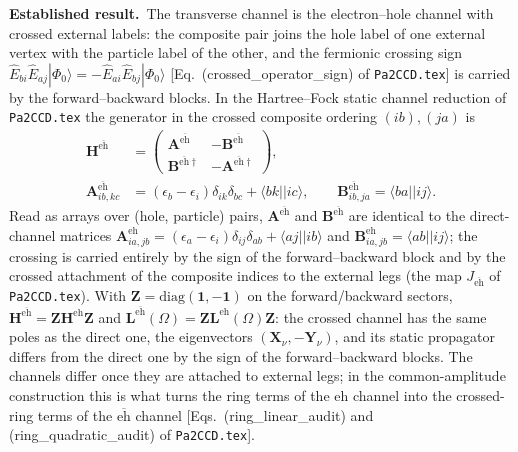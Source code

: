 \documentclass[aip,jcp,reprint,noshowkeys,superscriptaddress]{revtex4-1}
\newcommand{\bI}{\boldsymbol{1}}
\newcommand{\bH}{\boldsymbol{H}}
\newcommand{\bA}{\boldsymbol{A}}
\newcommand{\bB}{\boldsymbol{B}}
\newcommand{\bX}{\boldsymbol{X}}
\newcommand{\bY}{\boldsymbol{Y}}
\newcommand{\bZ}{\boldsymbol{Z}}
\newcommand{\eps}{\epsilon}
\newcommand{\eh}{\text{eh}}
\newcommand{\teh}{\overline{\text{eh}}}
\newcommand{\Established}{\textbf{Established result.}\ }
\begin{document}
\Established The transverse channel is the electron--hole channel with
crossed external labels: the composite pair joins the hole label of one
external vertex with the particle label of the other, and the fermionic
crossing sign
$\hat E_{bi}\hat E_{aj}|\Phi_0\rangle=-\hat E_{ai}\hat E_{bj}|\Phi_0\rangle$
[Eq.~(crossed\_operator\_sign) of \texttt{Pa2CCD.tex}] is carried by the
forward--backward blocks.  In the Hartree--Fock static channel reduction of
\texttt{Pa2CCD.tex} the generator in the crossed composite ordering
$(ib),(ja)$ is
\begin{align}
  \bH^{\teh}&=\begin{pmatrix}\bA^{\teh}&-\bB^{\teh}\\ \bB^{\teh\dagger}&-\bA^{\teh\dagger}\end{pmatrix},
  \nonumber\\
  \bA^{\teh}_{ib,kc}&=(\eps_b-\eps_i)\delta_{ik}\delta_{bc}+\langle bk||ic\rangle,
  \qquad
  \bB^{\teh}_{ib,ja}=\langle ba||ij\rangle .
  \label{eq:H-teh-HF}
\end{align}
Read as arrays over (hole, particle) pairs, $\bA^{\teh}$ and $\bB^{\teh}$ are
identical to the direct-channel matrices $\bA^{\eh}_{ia,jb}=(\eps_a-\eps_i)\delta_{ij}\delta_{ab}+\langle aj||ib\rangle$
and $\bB^{\eh}_{ia,jb}=\langle ab||ij\rangle$; the crossing is carried entirely
by the sign of the forward--backward block and by the crossed attachment of
the composite indices to the external legs (the map $J_{\teh}$ of
\texttt{Pa2CCD.tex}).  With $\bZ=\mathrm{diag}(\bI,-\bI)$ on the
forward/backward sectors,
$\bH^{\teh}=\bZ\bH^{\eh}\bZ$ and $\boldsymbol L^{\teh}(\Omega)=\bZ\boldsymbol L^{\eh}(\Omega)\bZ$:
the crossed channel has the same poles as the direct one, the eigenvectors
$(\bX_\nu,-\bY_\nu)$, and its static propagator differs from the direct one by
the sign of the forward--backward blocks.  The channels differ once they are
attached to external legs; in the common-amplitude construction this is what
turns the ring terms of the $\eh$ channel into the crossed-ring terms of the
$\teh$ channel [Eqs.~(ring\_linear\_audit) and (ring\_quadratic\_audit) of
\texttt{Pa2CCD.tex}].
\end{document}
